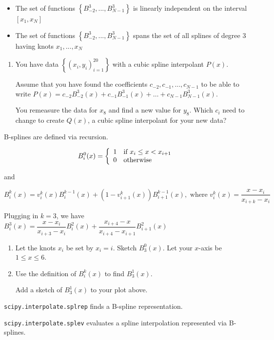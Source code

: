 \documentclass[12pt,letterpaper,noanswers]{exam}
\begin{document}
\begin{tcolorbox}
\begin{itemize}

    \item The set of functions $\left\{B_{-2}^3,...,B_{N-1}^3\right\}$ is linearly independent on the interval $[x_1,x_N]$
    \item The set of functions $\left\{B_{-2}^3,...,B_{N-1}^3\right\}$ spans the set of all splines of degree $3$ having knots $x_1,...,x_N$
\end{itemize}
\end{tcolorbox}
\begin{enumerate}[resume=classQ]
\item You have data $\left\{(x_i,y_i)_{i = 1}^{20} \right\}$ with a cubic spline interpolant $P(x)$.

Assume that you have found the coefficients $c_{-2}, c_{-1}, ..., c_{N-1}$ to be able to write $P(x) = c_{-2}B_{-2}^3(x) + c_{-1}B_{-1}^3(x) + \hdots + c_{N-1}B_{N-1}^3(x)$.  

You remeasure the data for $x_8$ and find a new value for $y_8$.  Which $c_i$ need to change to create $Q(x)$, a cubic spline interpolant for your new data?
\vspace{1in}

\end{enumerate}



\begin{tcolorbox}
B-splines are defined via recursion.

\[B_i^0(x) = \left\{\begin{array}{l l}
1 & \text{if }x_i\leq x < x_{i+1} \\
0 & \text{otherwise}
\end{array}\right.\]

and

\[B_i^k(x) = v_i^k(x)B_i^{k-1}(x) +\left(1-v_{i+1}^k(x)\right)B_{i+1}^{k-1}(x), \text{ where } v_i^k(x) = \dfrac{x-x_i}{x_{i+k}-x_i}\] 



Plugging in $k=3$, we have
$\displaystyle B_i^3(x) = \dfrac{x - x_i}{x_{i+3}-x_i} B_i^2(x) + \dfrac{x_{i+4}-x}{x_{i+4}-x_{i+1}}B_{i+1}^2(x)$

\end{tcolorbox}
\begin{enumerate}[resume=classQ]
\item Let the knots $x_i$ be set by $x_i = i$.  Sketch $B_3^0(x)$.  Let your $x$-axis be $1\leq x \leq 6$.
\vspace{1.5in}

\item Use the definition of $B_i^k(x)$ to find $B_3^1(x)$.

Add a sketch of $B_3^1(x)$ to your plot above.

\end{enumerate}

\texttt{scipy.interpolate.splrep} finds a B-spline representation.

\texttt{scipy.interpolate.splev} evaluates a spline interpolation represented via B-splines.
\end{document}
